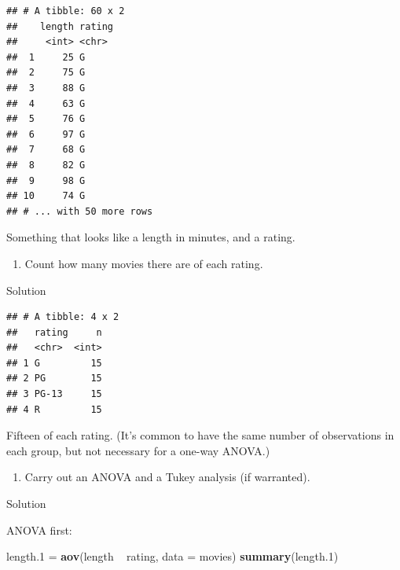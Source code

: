 \documentclass[]{tufte-book}
\newenvironment{Shaded}{}{}
\newcommand{\DataTypeTok}[1]{\textcolor[rgb]{0.56,0.13,0.00}{#1}}
\newcommand{\FloatTok}[1]{\textcolor[rgb]{0.25,0.63,0.44}{#1}}
\newcommand{\KeywordTok}[1]{\textcolor[rgb]{0.00,0.44,0.13}{\textbf{#1}}}
\newcommand{\NormalTok}[1]{#1}
\newcommand{\OperatorTok}[1]{\textcolor[rgb]{0.40,0.40,0.40}{#1}}
\newcommand{\StringTok}[1]{\textcolor[rgb]{0.25,0.44,0.63}{#1}}
\providecommand{\tightlist}{%
  \setlength{\itemsep}{0pt}\setlength{\parskip}{0pt}}
\theoremstyle{definition}
\theoremstyle{definition}
\theoremstyle{definition}
\theoremstyle{remark}
\begin{document}
\begin{verbatim}
## # A tibble: 60 x 2
##    length rating
##     <int> <chr> 
##  1     25 G     
##  2     75 G     
##  3     88 G     
##  4     63 G     
##  5     76 G     
##  6     97 G     
##  7     68 G     
##  8     82 G     
##  9     98 G     
## 10     74 G     
## # ... with 50 more rows
\end{verbatim}

Something that looks like a length in minutes, and a rating.

\begin{enumerate}
\def\labelenumi{(\alph{enumi})}
\setcounter{enumi}{1}
\tightlist
\item
  Count how many movies there are of each rating.
\end{enumerate}

Solution

\begin{Shaded}
\end{Shaded}

\begin{verbatim}
## # A tibble: 4 x 2
##   rating     n
##   <chr>  <int>
## 1 G         15
## 2 PG        15
## 3 PG-13     15
## 4 R         15
\end{verbatim}

Fifteen of each rating. (It's common to have the same number of
observations in each group, but not necessary for a one-way ANOVA.)

\begin{enumerate}
\def\labelenumi{(\alph{enumi})}
\setcounter{enumi}{2}
\tightlist
\item
  Carry out an ANOVA and a Tukey analysis (if warranted).
\end{enumerate}

Solution

ANOVA first:

\begin{Shaded}
\begin{Highlighting}[]
\NormalTok{length}\FloatTok{.1}\NormalTok{ =}\StringTok{ }\KeywordTok{aov}\NormalTok{(length }\OperatorTok{~}\StringTok{ }\NormalTok{rating, }\DataTypeTok{data =}\NormalTok{ movies)}
\KeywordTok{summary}\NormalTok{(length}\FloatTok{.1}\NormalTok{)}
\end{Highlighting}
\end{Shaded}
\end{document}
